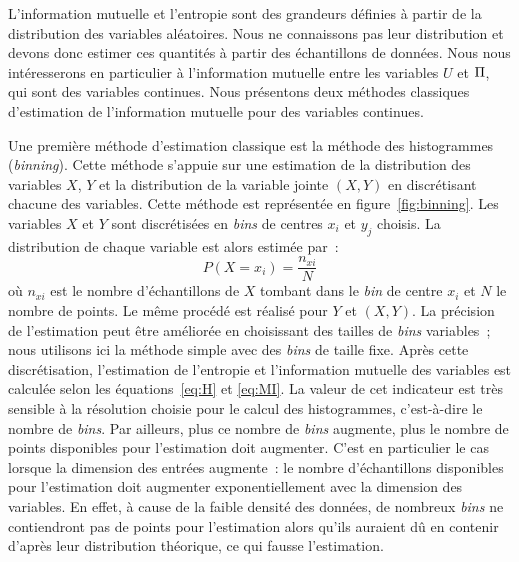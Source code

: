 \documentclass[../main]{subfiles}
\begin{document}
L'information mutuelle et l'entropie sont des grandeurs définies à partir de la distribution des variables aléatoires. Nous ne connaissons pas leur distribution et devons donc estimer ces quantités à partir des échantillons de données. 
Nous nous intéresserons en particulier à l'information mutuelle entre les variables $U$ et $\Pi$, qui sont des variables continues. Nous présentons deux méthodes classiques d'estimation de l'information mutuelle pour des variables continues.


Une première méthode d'estimation classique est la méthode des histogrammes (\emph{binning}).
Cette méthode s'appuie sur une estimation de la distribution des variables $X$, $Y$ et la distribution de la variable jointe $(X,Y)$ en discrétisant chacune des variables.
Cette méthode est représentée en figure~\ref{fig:binning}. Les variables $X$ et $Y$ sont discrétisées en \emph{bins} de centres $x_i$ et $y_j$ choisis.
La distribution de chaque variable est alors estimée par~: 
$$P(X = x_i) = \frac{n_{xi}}{N} $$ où $n_{xi}$ est le nombre d'échantillons de $X$ tombant dans le \emph{bin} de centre $x_i$ et $N$ le nombre de points. Le même procédé est réalisé pour $Y$ et $(X,Y)$. La précision de l'estimation peut être améliorée en choisissant des tailles de \emph{bins} variables~; nous utilisons ici la méthode simple avec des \emph{bins} de taille fixe.
Après cette discrétisation, l'estimation de l'entropie et l'information mutuelle des variables est calculée selon les équations~\ref{eq:H} et \ref{eq:MI}.
La valeur de cet indicateur est très sensible à la résolution choisie pour le calcul des histogrammes, c'est-à-dire le nombre de \emph{bins}.
Par ailleurs, plus ce nombre de \emph{bins} augmente, plus le nombre de points disponibles pour l'estimation doit augmenter. C'est en particulier le cas lorsque la dimension des entrées augmente~:
le nombre d'échantillons disponibles pour l'estimation doit augmenter exponentiellement avec la dimension des variables. En effet, à cause de la faible densité des données, de nombreux \emph{bins} ne contiendront pas de points pour l'estimation alors qu'ils auraient dû en contenir d'après leur distribution théorique, ce qui fausse l'estimation.
\end{document}
